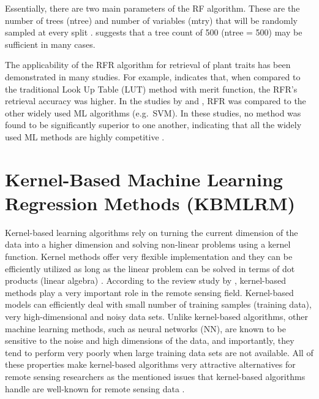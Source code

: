 \documentclass[a4paper, twoside]{templates/ociamthesis}
\begin{document}
Essentially, there are two main parameters of the RF algorithm. These are the number of trees (ntree) and number of variables (mtry) that will be randomly sampled at every split \citep{wang2018estimation}. \citet{breiman2001random} suggests that a tree count of 500 (ntree = 500) may be sufficient in many cases.

The applicability of the RFR algorithm for retrieval of plant traits has been demonstrated in many studies. For example, \citet{ali2020machine} indicates that, when compared to the traditional Look Up Table (LUT) method with merit function, the RFR's retrieval accuracy was higher. In the studies by \citet{han2016hyperspectral} and \citet{pullanagari2016mapping}, RFR was compared to the other widely used ML algorithms (e.g.~SVM). In these studies, no method was found to be significantly superior to one another, indicating that all the widely used ML methods are highly competitive \citep{verrelst2019quantifying}.

\hypertarget{kernel}{%
\section{Kernel-Based Machine Learning Regression Methods (KBMLRM)}\label{kernel}}

Kernel-based learning algorithms rely on turning the current dimension of the data into a higher dimension and solving non-linear problems using a kernel function. Kernel methods offer very flexible implementation and they can be efficiently utilized as long as the linear problem can be solved in terms of dot products (linear algebra) \citep{verrelst2019quantifying}. According to the review study by \citet{gomez2011review}, kernel-based methods play a very important role in the remote sensing field. Kernel-based models can efficiently deal with small number of training samples (training data), very high-dimensional and noisy data sets. Unlike kernel-based algorithms, other machine learning methods, such as neural networks (NN), are known to be sensitive to the noise and high dimensions of the data, and importantly, they tend to perform very poorly when large training data sets are not available. All of these properties make kernel-based algorithms very attractive alternatives for remote sensing researchers as the mentioned issues that kernel-based algorithms handle are well-known for remote sensing data \citep{gomez2011review}.
\end{document}
